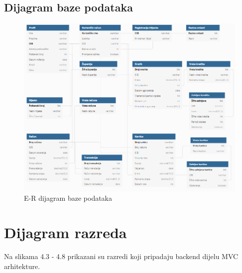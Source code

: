 			
			\subsection{Dijagram baze podataka}
			
				\begin{figure}[H]
					\includegraphics[scale=0.8]{Slike/ermodel.PNG}
					\centering
					\caption{E-R dijagram baze podataka}
					\label{fig:dijagram}
				\end{figure}
			\eject
			
			
		\section{Dijagram razreda}
		
		Na slikama 4.3 - 4.8 prikazani su razredi koji pripadaju backend dijelu MVC
		arhitekture.
		
